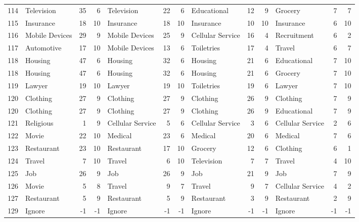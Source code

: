 \begin{figure}[htbp]
\begin{tabular}{rlrrlrrlrrlrr}
    114   & Television & 35    & 6     & Television & 22    & 6     & Educational & 12    & 9     & Grocery & 7     & 7 \\
    115   & Insurance & 18    & 10    & Insurance & 18    & 10    & Insurance & 10    & 10    & Insurance & 6     & 10 \\
    116   & Mobile Devices & 29    & 9     & Mobile Devices & 25    & 9     & Cellular Service & 16    & 4     & Recruitment & 6     & 2 \\
    117   & Automotive & 17    & 10    & Mobile Devices & 13    & 6     & Toiletries & 17    & 4     & Travel & 6     & 7 \\
    118   & Housing & 47    & 6     & Housing & 32    & 6     & Housing & 21    & 6     & Educational & 7     & 10 \\
    118   & Housing & 47    & 6     & Housing & 32    & 6     & Housing & 21    & 6     & Grocery & 7     & 10 \\
    119   & Lawyer & 19    & 10    & Lawyer & 19    & 10    & Toiletries & 19    & 6     & Lawyer & 7     & 10 \\
    120   & Clothing & 27    & 9     & Clothing & 27    & 9     & Clothing & 26    & 9     & Clothing & 7     & 9 \\
    120   & Clothing & 27    & 9     & Clothing & 27    & 9     & Clothing & 26    & 9     & Educational & 7     & 9 \\
    121   & Religious & 1     & 9     & Cellular Service & 5     & 6     & Cellular Service & 3     & 6     & Cellular Service & 2     & 6 \\
    122   & Movie & 22    & 10    & Medical & 23    & 6     & Medical & 20    & 6     & Medical & 7     & 6 \\
    123   & Restaurant & 23    & 10    & Restaurant & 17    & 10    & Grocery & 12    & 6     & Clothing & 6     & 1 \\
    124   & Travel & 7     & 10    & Travel & 6     & 10    & Television & 7     & 7     & Travel & 4     & 10 \\
    125   & Job   & 26    & 9     & Job   & 26    & 9     & Job   & 21    & 9     & Job   & 7     & 9 \\
    126   & Movie & 5     & 8     & Travel & 9     & 7     & Travel & 9     & 7     & Cellular Service & 4     & 2 \\
    127   & Restaurant & 5     & 9     & Restaurant & 5     & 9     & Restaurant & 3     & 9     & Restaurant & 2     & 9 \\
    129   & Ignore & -1    & -1    & Ignore & -1    & -1    & Ignore & -1    & -1    & Ignore & -1    & -1 \\

\end{tabular}
\end{figure}
